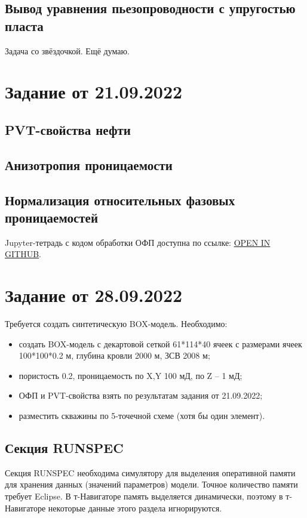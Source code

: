 \documentclass[a4paper,12pt]{article}
\begin{document}
\subsection{Вывод уравнения пьезопроводности с упругостью пласта}

Задача со звёздочкой. Ещё думаю.

\section{Задание от 21.09.2022}

\subsection{PVT-свойства нефти}

\subsection{Анизотропия проницаемости}

\subsection{Нормализация относительных фазовых проницаемостей}
Jupyter-тетрадь с кодом обработки ОФП доступна по ссылке: \href{https://github.com/mualal/notebooks-source/blob/master/9_labdata_relative_permeabilities.ipynb}{OPEN IN GITHUB}.


\newpage
\section{Задание от 28.09.2022}

Требуется создать синтетическую BOX-модель. Необходимо:
\begin{itemize}
	\item создать BOX-модель с декартовой сеткой 61*114*40 ячеек с размерами ячеек 100*100*0.2 м, глубина кровли 2000 м, ЗСВ 2008 м;
	\item пористость 0.2, проницаемость по X,Y 100 мД, по Z -- 1 мД;
	\item ОФП и PVT-свойства взять по результатам задания от 21.09.2022;
	\item разместить скважины по 5-точечной схеме (хотя бы один элемент).
\end{itemize}

\subsection{Секция RUNSPEC}
Секция RUNSPEC необходима симулятору для выделения оперативной памяти для хранения данных (значений параметров) модели.
Точное количество памяти требует Eclipse.
В т-Навигаторе память выделяется динамически, поэтому в т-Навигаторе некоторые данные этого раздела игнорируются. 
\end{document}
